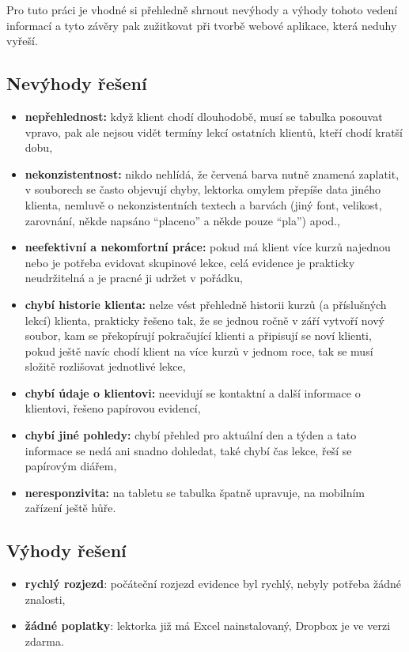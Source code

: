     Pro tuto práci je vhodné si přehledně shrnout nevýhody a výhody tohoto vedení informací a tyto závěry pak zužitkovat při tvorbě webové aplikace, která neduhy vyřeší.
    
        \subsection{Nevýhody řešení}
        \begin{itemize}
            \item \textbf{nepřehlednost:} když klient chodí dlouhodobě, musí se tabulka posouvat vpravo, pak ale nejsou vidět termíny lekcí ostatních klientů, kteří chodí kratší dobu,
            \item \textbf{nekonzistentnost:} nikdo nehlídá, že červená barva nutně znamená zaplatit, v souborech se často objevují chyby, lektorka omylem přepíše data jiného klienta, nemluvě o nekonzistentních textech a barvách (jiný font, velikost, zarovnání, někde napsáno \enquote{placeno} a někde pouze \enquote{pla}) apod.,
            \item \textbf{neefektivní a nekomfortní práce:} pokud má klient více kurzů najednou nebo je potřeba evidovat skupinové lekce, celá evidence je prakticky neudržitelná a je pracné ji udržet v pořádku,
            \item \textbf{chybí historie klienta:} nelze vést přehledně historii kurzů (a příslušných lekcí) klienta, prakticky řešeno tak, že se jednou ročně v září vytvoří nový soubor, kam se překopírují pokračující klienti a připisují se noví klienti, pokud ještě navíc chodí klient na více kurzů v jednom roce, tak se musí složitě rozlišovat jednotlivé lekce,
            \item \textbf{chybí údaje o klientovi:} neevidují se kontaktní a další informace o klientovi, řešeno papírovou evidencí,
            \item \textbf{chybí jiné pohledy:} chybí přehled pro aktuální den a týden a tato informace se nedá ani snadno dohledat, také chybí čas lekce, řeší se papírovým diářem,
            \item \textbf{neresponzivita:} na tabletu se tabulka špatně upravuje, na mobilním zařízení ještě hůře.
        \end{itemize}
        
        \subsection{Výhody řešení}
        \begin{itemize}
            \item \textbf{rychlý rozjezd}: počáteční rozjezd evidence byl rychlý, nebyly potřeba žádné znalosti,
            \item \textbf{žádné poplatky}: lektorka již má Excel nainstalovaný, Dropbox je ve verzi zdarma.
        \end{itemize}
        
